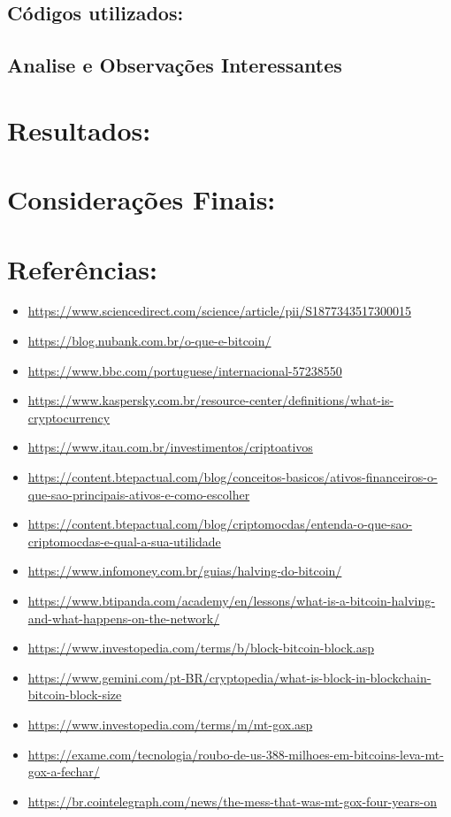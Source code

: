 \documentclass[12pt]{article}
\begin{document}
\subsection*{Códigos utilizados:}

\subsection*{Analise e Observações Interessantes}



\newpage %


\section*{Resultados:}

\section*{Considerações Finais:}

\section*{Referências:}
\begin{itemize}
    \item \url{https://www.sciencedirect.com/science/article/pii/S1877343517300015}
    \item \url{https://blog.nubank.com.br/o-que-e-bitcoin/}
    \item \url{https://www.bbc.com/portuguese/internacional-57238550}
    \item \url{https://www.kaspersky.com.br/resource-center/definitions/what-is-cryptocurrency}
    \item \url{https://www.itau.com.br/investimentos/criptoativos}
    \item \url{https://content.btepactual.com/blog/conceitos-basicos/ativos-financeiros-o-que-sao-principais-ativos-e-como-escolher}
    \item \url{https://content.btepactual.com/blog/criptomocdas/entenda-o-que-sao-criptomocdas-e-qual-a-sua-utilidade}
    \item \url{https://www.infomoney.com.br/guias/halving-do-bitcoin/}
    \item \url{https://www.btipanda.com/academy/en/lessons/what-is-a-bitcoin-halving-and-what-happens-on-the-network/}
    \item \url{https://www.investopedia.com/terms/b/block-bitcoin-block.asp}
    \item \url{https://www.gemini.com/pt-BR/cryptopedia/what-is-block-in-blockchain-bitcoin-block-size}
    \item \url{https://www.investopedia.com/terms/m/mt-gox.asp}
    \item \url{https://exame.com/tecnologia/roubo-de-us-388-milhoes-em-bitcoins-leva-mt-gox-a-fechar/}
    \item \url{https://br.cointelegraph.com/news/the-mess-that-was-mt-gox-four-years-on}
\end{itemize}
\end{document}
